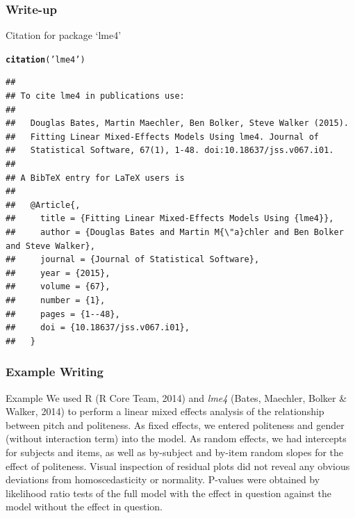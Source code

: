 \documentclass[10p]{beamer}\usepackage[]{graphicx}\usepackage[]{color}
\makeatletter
\newcommand{\hlstr}[1]{\textcolor[rgb]{0.192,0.494,0.8}{#1}}%
\newcommand{\hlstd}[1]{\textcolor[rgb]{0.345,0.345,0.345}{#1}}%
\newcommand{\hlkwd}[1]{\textcolor[rgb]{0.737,0.353,0.396}{\textbf{#1}}}%
\newenvironment{kframe}{%
 \def\at@end@of@kframe{}%
 \ifinner\ifhmode%
  \def\at@end@of@kframe{\end{minipage}}%
  \begin{minipage}{\columnwidth}%
 \fi\fi%
 \def\FrameCommand##1{\hskip\@totalleftmargin \hskip-\fboxsep
 \colorbox{shadecolor}{##1}\hskip-\fboxsep
     \hskip-\linewidth \hskip-\@totalleftmargin \hskip\columnwidth}%
 \MakeFramed {\advance\hsize-\width
   \@totalleftmargin\z@ \linewidth\hsize
   \@setminipage}}%
 {\par\unskip\endMakeFramed%
 \at@end@of@kframe}
\newenvironment{knitrout}{}{} %
\makeatother
\begin{document}
\begin{frame}[fragile]
\frametitle{Write-up}
Citation for package `lme4'
\begin{knitrout}\scriptsize
{}\color{fgcolor}\begin{kframe}
\begin{alltt}
\hlkwd{citation}\hlstd{(}\hlstr{'lme4'}\hlstd{)}
\end{alltt}
\begin{verbatim}
## 
## To cite lme4 in publications use:
## 
##   Douglas Bates, Martin Maechler, Ben Bolker, Steve Walker (2015).
##   Fitting Linear Mixed-Effects Models Using lme4. Journal of
##   Statistical Software, 67(1), 1-48. doi:10.18637/jss.v067.i01.
## 
## A BibTeX entry for LaTeX users is
## 
##   @Article{,
##     title = {Fitting Linear Mixed-Effects Models Using {lme4}},
##     author = {Douglas Bates and Martin M{\"a}chler and Ben Bolker and Steve Walker},
##     journal = {Journal of Statistical Software},
##     year = {2015},
##     volume = {67},
##     number = {1},
##     pages = {1--48},
##     doi = {10.18637/jss.v067.i01},
##   }
\end{verbatim}
\end{kframe}
\end{knitrout}
\end{frame}

\begin{frame}
\frametitle{Example Writing}
\begin{block}{Example}
\rmfamily \small \justifying
We used R (R Core Team, 2014) and \textit{lme4} (Bates, Maechler, Bolker \& Walker, 2014) to perform a linear mixed effects analysis of the relationship between pitch and politeness. 
As fixed effects, we entered politeness and gender (without interaction term) into the model. As random effects, we had intercepts for subjects and items, as well as by-subject and by-item random slopes for the effect of politeness. 
Visual inspection of residual plots did not reveal any obvious deviations from homoscedasticity or normality. 
P-values were obtained by likelihood ratio tests of the full model with the effect in question against the model without the effect in question.
\end{block}
\end{frame}
\end{document}
